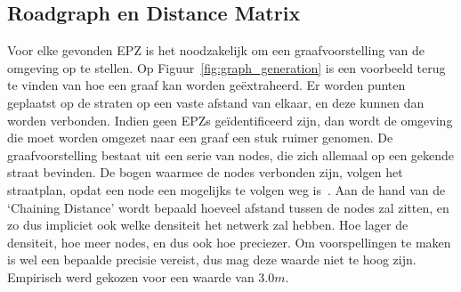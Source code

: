 \subsection{Roadgraph en Distance Matrix}\label{sec:roadgraph}
Voor elke gevonden EPZ is het noodzakelijk om een graafvoorstelling van de
omgeving op te stellen. Op Figuur~\ref{fig:graph_generation} is een voorbeeld
terug te vinden van hoe een graaf kan worden geëxtraheerd. Er worden punten
geplaatst op de straten op een vaste afstand van elkaar, en deze kunnen dan
worden verbonden. Indien geen \acp{EPZ} geïdentificeerd zijn, dan wordt de
omgeving die moet worden omgezet naar een graaf een stuk ruimer genomen. De
graafvoorstelling bestaat uit een serie van nodes, die zich allemaal op een
gekende straat bevinden. De bogen waarmee de nodes verbonden zijn, volgen het
straatplan, opdat een node een mogelijks te volgen weg
is~\cite{neira2022graph}. Aan de hand van de `Chaining Distance' wordt bepaald
hoeveel afstand tussen de nodes zal zitten, en zo dus impliciet ook welke
densiteit het netwerk zal hebben. Hoe lager de densiteit, hoe meer nodes, en
dus ook hoe preciezer. Om voorspellingen te maken is wel een bepaalde precisie
vereist, dus mag deze waarde niet te hoog zijn. Empirisch werd gekozen voor een
waarde van $3.0m$.
